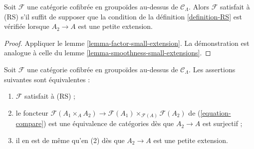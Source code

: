 \begin{lemma}
\label{lemma-RS-small-extension}
Soit $\mathcal{F}$ une catégorie cofibrée en groupoïdes au-dessus de $\mathcal
C_\Lambda$. Alors $\mathcal{F}$ satisfait à (RS) s'il suffit de supposer que
la condition de la définition \ref{definition-RS} est vérifiée lorsque
$A_2 \to A$ est une petite extension.
\end{lemma}

\begin{proof}
Appliquer le lemme \ref{lemma-factor-small-extension}. La démonstration est
analogue à celle du lemme \ref{lemma-smoothness-small-extensions}.
\end{proof}

\begin{lemma}
\label{lemma-RS-2-categorical}
Soit $\mathcal{F}$ une catégorie cofibrée en groupoïdes au-dessus de
$\mathcal{C}_\Lambda$. Les assertions suivantes sont équivalentes :
\begin{enumerate}
\item $\mathcal{F}$ satisfait à (RS) ;
\item le foncteur
$\mathcal{F}(A_1 \times_A A_2) \to
\mathcal{F}(A_1) \times_{\mathcal{F}(A)} \mathcal{F}(A_2)$
de (\ref{equation-compare}) est une équivalence de catégories dès que
$A_2 \to A$ est surjectif ;
\item il en est de même qu'en (2) dès que $A_2 \to A$ est une petite extension.
\end{enumerate}
\end{lemma}

